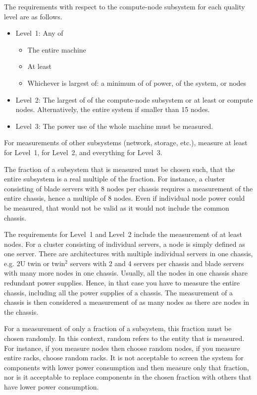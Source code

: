 The requirements with respect to the compute-node subsystem for each quality level are as follows.

\begin{itemize}
\item
Level~1: Any of
\begin{itemize}
\item The entire machine
\item At least \SpecPowerMaxLOne{}
\item Whichever is largest of: a minimum of \SpecPowerMinLOne{} of power, \SpecFracMinLOne{} of the system, or \SpecMinNodes{} nodes
\end{itemize}

\item
Level~2: The largest of \SpecFracMinLTwo{} of the compute-node subsystem or at least \SpecPowerMinLTwo{} or \SpecMinNodes{} compute nodes.
Alternatively, the entire system if smaller than \num{15} nodes.
\item
Level~3: The power use of the whole machine must be measured.
\end{itemize}

For measurements of other subsystems (network, storage, etc.), measure at least \SpecFracMinLOne{} for Level~1, \SpecFracMinLTwo{} for Level~2, and everything for Level~3.

The fraction of a subsystem that is measured must be chosen such, that the entire subsystem is a real multiple of the fraction.
For instance, a cluster consisting of blade servers with \num{8} nodes per chassis requires a measurement of the entire chassis, hence a multiple of \num{8} nodes.
Even if individual node power could be measured, that would not be valid as it would not include the common chassis.

The requirements for Level~1 and Level~2 include the measurement of at least \SpecMinNodes{} nodes.
For a cluster consisting of individual servers, a node is simply defined as one server.
There are architectures with multiple individual servers in one chassis, e.g.
2U twin or twin$^2$ servers with \num{2} and \num{4} servers per chassis and blade servers with many more nodes in one chassis.
Usually, all the nodes in one chassis share redundant power supplies.
Hence, in that case you have to measure the entire chassis, including all the power supplies of a chassis.
The measurement of a chassis is then considered a measurement of as many nodes as there are nodes in the chassis.

For a measurement of only a fraction of a subsystem, this fraction must be chosen randomly.
In this context, random refers to the entity that is measured.
For instance, if you measure nodes then choose random nodes, if you measure entire racks, choose random racks.
It is not acceptable to screen the system for components with lower power consumption and then measure only that fraction, nor is it acceptable to replace components in the chosen fraction with others that have lower power consumption.

